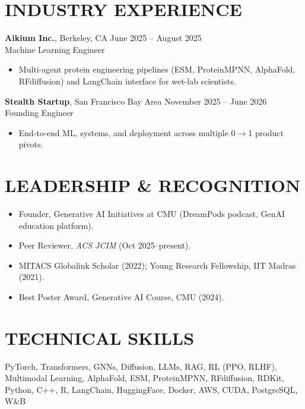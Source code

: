 \documentclass[letterpaper,10pt]{article}
\begin{document}
\section*{INDUSTRY EXPERIENCE}
\noindent\textbf{Aikium Inc.}, Berkeley, CA \hfill June 2025 -- August 2025\\
Machine Learning Engineer
\begin{itemize}
    \item Multi-agent protein engineering pipelines (ESM, ProteinMPNN, AlphaFold, RFdiffusion) and LangChain interface for wet-lab scientists.
\end{itemize}

\noindent\textbf{Stealth Startup}, San Francisco Bay Area \hfill November 2025 -- June 2026\\
Founding Engineer
\begin{itemize}
    \item End-to-end ML, systems, and deployment across multiple 0$\to$1 product pivots.
\end{itemize}

\section*{LEADERSHIP \& RECOGNITION}
\begin{itemize}
    \item Founder, Generative AI Initiatives at CMU (DreamPods podcast, GenAI education platform).
    \item Peer Reviewer, \textit{ACS JCIM} (Oct 2025--present).
    \item MITACS Globalink Scholar (2022); Young Research Fellowship, IIT Madras (2021).
    \item Best Poster Award, Generative AI Course, CMU (2024).
\end{itemize}

\section*{TECHNICAL SKILLS}
\noindent
PyTorch, Transformers, GNNs, Diffusion, LLMs, RAG, RL (PPO, RLHF), Multimodal Learning, AlphaFold, ESM, ProteinMPNN, RFdiffusion, RDKit, Python, C++, R, LangChain, HuggingFace, Docker, AWS, CUDA, PostgreSQL, W\&B
\end{document}
